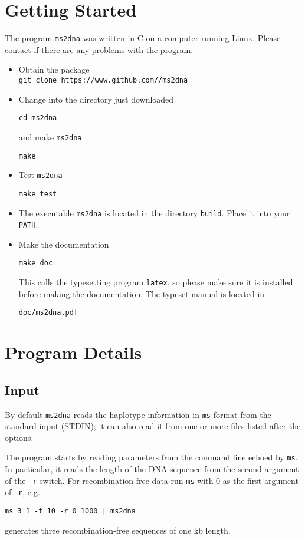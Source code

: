 \documentclass[a4paper, english]{article}
\begin{document}
\section{Getting Started}
The program \texttt{ms2dna} was written in C on a computer running Linux.
Please contact \texttt{} if there are any problems
with the program.
\begin{itemize}
\item Obtain the package\\
\texttt{git clone https://www.github.com//ms2dna}
\item Change into the directory just downloaded
\begin{verbatim}
cd ms2dna
\end{verbatim}
and make \texttt{ms2dna}
\begin{verbatim}
make
\end{verbatim}
\item Test \texttt{ms2dna}
\begin{verbatim}
make test
\end{verbatim}
\item The executable \texttt{ms2dna} is located in the
  directory \texttt{build}. Place it into your \texttt{PATH}.
\item Make the documentation
\begin{verbatim}
make doc
\end{verbatim}
This calls the typesetting program \texttt{latex}, so please make sure
it is installed before making the documentation. The typeset manual is
located in
\begin{verbatim}
doc/ms2dna.pdf
\end{verbatim}
\end{itemize}

\section*{Program Details}
\subsection*{Input}
By default \texttt{ms2dna} reads the haplotype information in \texttt{ms}
format from the standard input (STDIN); it can also read it from one
or more files listed after the options. 

The program starts by reading parameters from the 
command line echoed by \texttt{ms}. In 
particular, it reads the length of the DNA sequence from the second
argument of the \texttt{-r} switch. For recombination-free data run \texttt{ms} with 0 as the
first argument of \texttt{-r}, e.g.
\begin{verbatim}
ms 3 1 -t 10 -r 0 1000 | ms2dna
\end{verbatim}
generates three recombination-free sequences of one kb length.
\end{document}
